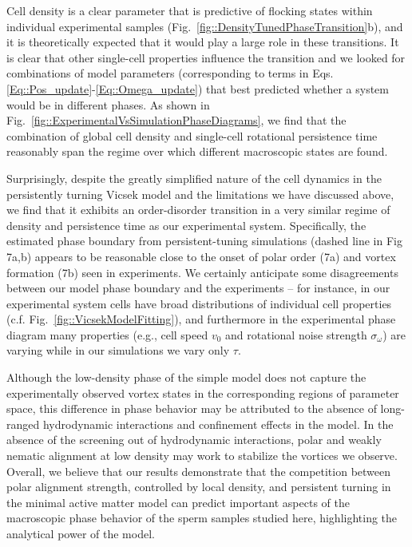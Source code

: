 \documentclass[reprint,unsortedaddress,amsmath,amssymb,aps,pre]{revtex4-2}
\begin{document}
Cell density is a clear parameter that is predictive of flocking states within individual experimental samples (Fig.~\ref{fig::DensityTunedPhaseTransition}b), and it is theoretically expected that it would play a large role in these transitions. It is clear that other single-cell properties influence the transition and we looked for combinations of model parameters  (corresponding to terms in Eqs. \ref{Eq::Pos_update}-\ref{Eq::Omega_update})  that best predicted whether a system would be in different phases. As shown in Fig.~\ref{fig::ExperimentalVsSimulationPhaseDiagrams}, we find that the combination of global cell density and single-cell rotational persistence time reasonably span the regime over which different macroscopic states are found. 


Surprisingly, despite the greatly simplified nature of the cell dynamics in the persistently turning Vicsek model and the limitations we have discussed above, we find that it exhibits an order-disorder transition in a very similar regime of density and persistence time as our experimental system. Specifically, the estimated phase boundary from persistent-tuning simulations (dashed line in Fig 7a,b) appears to be reasonable close to the onset of polar order (7a) and vortex formation (7b) seen in experiments. We certainly anticipate some disagreements between  our model phase boundary and the experiments -- for instance, in our experimental system cells have broad distributions of individual cell properties (c.f. Fig.~\ref{fig::VicsekModelFitting}), and furthermore in the experimental phase diagram many properties (e.g., cell speed $v_{0}$ and rotational noise strength $\sigma_{\omega}$) are varying while in our simulations we vary only $\tau$. 


Although the low-density phase of the simple model does not capture the experimentally observed vortex states in the corresponding regions of parameter space, this difference in phase behavior may be attributed to the absence of long-ranged hydrodynamic interactions and confinement effects in the model. In the absence of the screening out of hydrodynamic interactions, polar and weakly nematic alignment at low density may work to stabilize the vortices we observe. Overall, we believe that our results demonstrate that the competition between polar alignment strength, controlled by local density, and persistent turning in the minimal active matter model can predict important aspects of the macroscopic phase behavior of the sperm samples studied here, highlighting the analytical power of the model.
\end{document}
